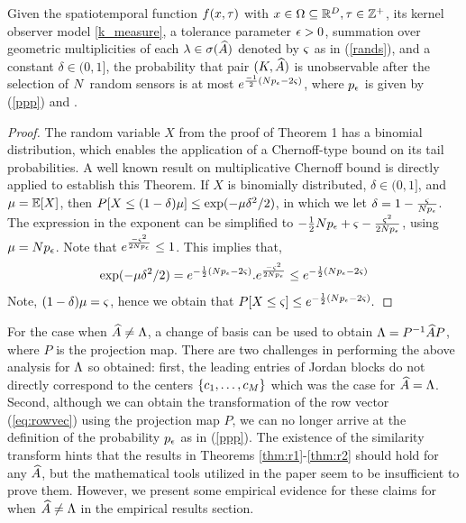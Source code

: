 \begin{theorem}\label{thm:r2}
	Given the spatiotemporal function $ f(x,\tau) $ with $ x \in \Omega \subseteq  \mathbb{R}^{D}, \tau\in \mathbb{Z}^+  $, its kernel observer model \eqref{k_measure}, a tolerance parameter $\epsilon>0$, summation over geometric multiplicities of each $ \lambda \in \sigma(\widehat{A}) $ denoted by $ \varsigma  $ as in  (\ref{rands}), and a constant $ \delta \in (0,1] $, the probability that pair $ (K, \widehat{A}) $ is unobservable after the selection of $ N $ random sensors is at most $ e^{\frac{-1}{2}(N p_{\epsilon}-2\varsigma)} $, where $ p_{\epsilon} $ is given by (\ref{ppp}) and .
\end{theorem}
\begin{proof}
	The random variable $ X $ from the proof of Theorem 1 has a binomial distribution, which enables the application of a Chernoff-type bound on its tail probabilities. A well known result  on multiplicative Chernoff bound \cite{motwani2010randomized} is directly applied to establish this Theorem. If $ X $ is binomially distributed, $ \delta \in (0,1] $, and $ \mu = \mathbb{E}[X] $, then $ P[X\leq(1-\delta)\mu] \leq \exp(-\mu \delta^2/2) $, in which we let $ \delta = 1-\frac{\varsigma}{N p_{\epsilon}}$.  The expression in the exponent can be simplified to $ -\frac{1}{2}N p_{\epsilon}+\varsigma - \frac{\varsigma^2}{2N p_{\epsilon}} $, using $ \mu = N p_{\epsilon} $. Note that $ e^{\frac{-\varsigma^2}{2N p_{\epsilon}}} \leq 1$. This implies that,
	\begin{equation*}
	\exp(-\mu \delta^2/2) =  e^{-\frac{1}{2}(N p_{\epsilon}-2\varsigma)}.e^{\frac{-\varsigma^2}{2N p_{\epsilon}}}\leq e^{-\frac{1}{2}(N p_{\epsilon}-2\varsigma)}
	\end{equation*}
	Note, $ (1-\delta)\mu = \varsigma $, hence we obtain that $ P[X\leq\varsigma] \leq e^{-\frac{1}{2}(N p_{\epsilon}-2\varsigma)}. $
\end{proof}


For the case when $ \widehat{A} \neq \Lambda $, a change of basis can be used to obtain $ \Lambda = P^{-1}\widehat{A} P $, where $ P $ is the projection map. There are two challenges in performing the above analysis for $\Lambda$ so obtained: first, the leading entries of Jordan blocks do not directly correspond to the centers $\{ c_1,\dots,c_M\}$ which was the case for $ \widehat{A} = \Lambda $. Second, although we can obtain the transformation of the row vector (\ref{eq:rowvec}) using the projection map $P$, we can no longer arrive at the definition of the probability $p_{\epsilon}$ as in  (\ref{ppp}). The existence of the similarity transform hints that the results in Theorems \ref{thm:r1}-\ref{thm:r2} should hold for any $ \widehat{A}$, but the mathematical tools utilized in the paper seem to be insufficient to prove them. However, we present some empirical evidence for these claims for when $ \widehat{A} \neq \Lambda $  in the empirical results section.%


